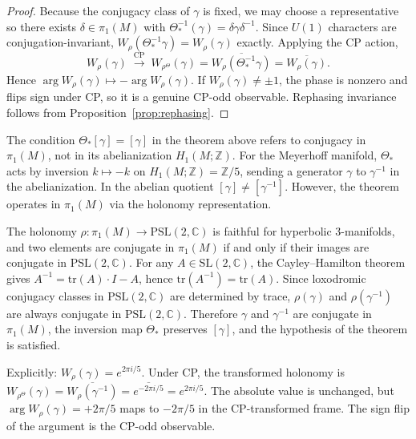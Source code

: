 \documentclass[12pt]{article}
\begin{document}
\begin{proof}
Because the conjugacy class of $\gamma$ is fixed, we may choose a representative
so there exists $\delta\in\pi_1(M)$ with $\Theta_*^{-1}(\gamma)=\delta\gamma\delta^{-1}$.
Since $U(1)$ characters are conjugation-invariant,
$W_\rho(\Theta_*^{-1}\gamma) = W_\rho(\gamma)$ exactly.
Applying the CP action,
\[
W_\rho(\gamma) \;\xrightarrow{\text{CP}}\; W_{\rho^\Theta}(\gamma)
= \overline{W_\rho(\Theta_*^{-1}\gamma)} = \overline{W_\rho(\gamma)}.
\]
Hence $\arg W_\rho(\gamma) \mapsto -\arg W_\rho(\gamma)$.
If $W_\rho(\gamma) \neq \pm 1$, the phase is nonzero and flips sign under CP,
so it is a genuine CP-odd observable.  Rephasing invariance follows from
Proposition~\ref{prop:rephasing}.
\end{proof}

\begin{remark}
\label{rem:conjugacy}
The condition $\Theta_*[\gamma] = [\gamma]$ in the theorem above
refers to conjugacy in $\pi_1(M)$, not in its abelianization
$H_1(M;\mathbb{Z})$. For the Meyerhoff manifold, $\Theta_*$ acts by
inversion $k \mapsto -k$ on $H_1(M;\mathbb{Z}) = \mathbb{Z}/5$,
sending a generator $\gamma$ to $\gamma^{-1}$ in the abelianization.
In the abelian quotient $[\gamma] \neq [\gamma^{-1}]$. However, the
theorem operates in $\pi_1(M)$ via the holonomy representation.

The holonomy $\rho \colon \pi_1(M) \to \mathrm{PSL}(2,\mathbb{C})$
is faithful for hyperbolic 3-manifolds, and two elements are conjugate
in $\pi_1(M)$ if and only if their images are conjugate in
$\mathrm{PSL}(2,\mathbb{C})$. For any $A \in \mathrm{SL}(2,\mathbb{C})$,
the Cayley--Hamilton theorem gives $A^{-1} = \mathrm{tr}(A)\cdot I - A$,
hence $\mathrm{tr}(A^{-1}) = \mathrm{tr}(A)$. Since loxodromic conjugacy
classes in $\mathrm{PSL}(2,\mathbb{C})$ are determined by trace,
$\rho(\gamma)$ and $\rho(\gamma^{-1})$ are always conjugate in
$\mathrm{PSL}(2,\mathbb{C})$. Therefore $\gamma$ and $\gamma^{-1}$
are conjugate in $\pi_1(M)$, the inversion map $\Theta_*$ preserves
$[\gamma]$, and the hypothesis of the theorem is satisfied.

Explicitly: $W_\rho(\gamma) = e^{2\pi i/5}$. Under CP, the transformed
holonomy is $W_{\rho^\Theta}(\gamma) = \overline{W_\rho(\gamma^{-1})}
= \overline{e^{-2\pi i/5}} = e^{2\pi i/5}$. The absolute value is
unchanged, but $\arg W_\rho(\gamma) = +2\pi/5$ maps to $-2\pi/5$ in
the CP-transformed frame. The sign flip of the argument is the CP-odd
observable.
\end{remark}
\end{document}
